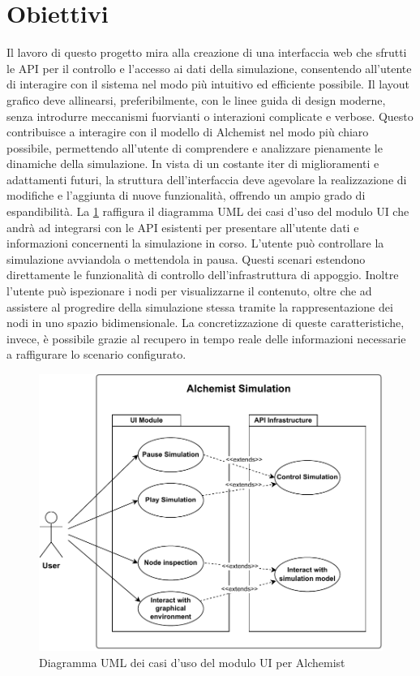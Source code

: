 \section{Obiettivi}
Il lavoro di questo progetto mira alla creazione di una interfaccia web che sfrutti le \ac{API} per il controllo e l'accesso ai dati della simulazione, consentendo all'utente di interagire con il sistema nel modo più intuitivo ed efficiente possibile. Il layout grafico deve allinearsi, preferibilmente, con le linee guida di design moderne, senza introdurre meccanismi fuorvianti o interazioni complicate e verbose. Questo contribuisce a interagire con il modello  di Alchemist nel modo più chiaro possibile, permettendo all'utente di comprendere e analizzare pienamente le dinamiche della simulazione.
In vista di un costante iter di miglioramenti e adattamenti futuri, la struttura dell'interfaccia deve agevolare la realizzazione di modifiche e l'aggiunta di nuove funzionalità, offrendo un ampio grado di espandibilità.
La \cref{fig:use-cases} raffigura il diagramma UML dei casi d'uso del modulo UI che andrà ad integrarsi con le \ac{API} esistenti per presentare all'utente dati e informazioni concernenti la simulazione in corso. L'utente può controllare la simulazione avviandola o mettendola in pausa. Questi scenari estendono direttamente le funzionalità di controllo dell'infrastruttura di appoggio. Inoltre l'utente può ispezionare i nodi per visualizzarne il contenuto, oltre che ad assistere al progredire della simulazione stessa tramite la rappresentazione dei nodi in uno spazio bidimensionale. La concretizzazione di queste caratteristiche, invece, è possibile grazie al recupero in tempo reale delle informazioni necessarie a raffigurare lo scenario configurato.
\begin{figure}[htb]
	\centering
	\includegraphics[width=.8\linewidth]{imgs/Use_cases.pdf}
	\caption{Diagramma UML dei casi d'uso del modulo UI per Alchemist}
	\label{fig:use-cases}
\end{figure}

